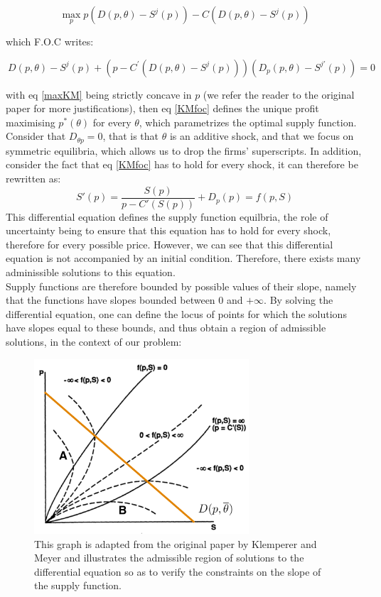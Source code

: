 \begin{equation}\label{maxKM}
\max_p p\left( D(p,\theta) - S^j(p)\right) - C\left( D(p,\theta) - S^j(p)\right) 
\end{equation}

which F.O.C writes:

\begin{equation}\label{KMfoc}
\ D(p,\theta) - S^j(p) + \left( p - C^\prime\left( D(p,\theta) - S^j(p)\right)    \right)\left(  D_p(p,\theta)   - S^{j\prime}(p)\right) = 0
\end{equation}

with eq \ref{maxKM} being strictly concave in $p$ (we refer the reader to the original paper for more justifications), then eq \ref{KMfoc} defines the unique profit maximising $p^*(\theta)$ for every $\theta$, which parametrizes the optimal supply function. \\

Consider that $D_{\theta p }=0$, that is that $\theta$ is an additive shock, and that we focus on symmetric equilibria, which allows us to drop the firms' superscripts. In addition, consider the fact that eq \ref{KMfoc} has to hold for every shock, it can therefore be rewritten as:
\begin{equation}\label{KMdiff}
S'(p) = \frac{S(p)}{p-C'(S(p))} + D_p(p)= f(p,S)
\end{equation}
This differential equation defines the supply function equilbria, the role of uncertainty being to ensure that this equation has to hold for every shock, therefore for every possible price. However, we can see that this differential equation is not accompanied by an initial condition. Therefore, there exists many adminissible solutions to this equation.\\

Supply functions are therefore bounded by possible values of their slope, namely that the functions have slopes bounded between $0$ and $+\infty$. By solving the differential equation, one can define the locus of points for which the solutions have slopes equal to these bounds, and thus obtain a region of admissible solutions, in the context of our problem:

\begin{figure}[h]
\centering
\includegraphics[width=8cm]{figintro/KMboundaries.png}
\caption{\small{This graph is adapted from the original paper by Klemperer and Meyer and illustrates the admissible region of solutions to the differential equation so as to verify the constraints on the slope of the supply function.}}
\label{KMboundaries}
\end{figure}

